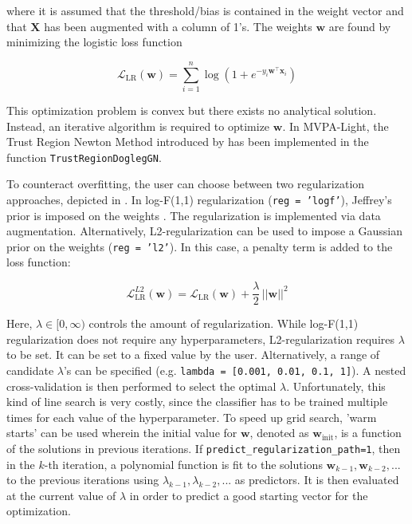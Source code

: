 \documentclass[utf8]{frontiersSCNS} %
\newcommand{\w}{\mathbf{w}}
\newcommand{\x}{\mathbf{x}}
\renewcommand{\L}{\mathcal{L}}
\newcommand{\X}{\mathbf{X}}
\newcommand{\ttt}[1]{\texttt{#1}}
\begin{document}
where it is assumed that the threshold/bias is contained in the weight vector and that $\X$ has been augmented with a column of 1's. The weights $\w$ are found by minimizing the logistic loss function

\begin{equation}
\label{eq:logreg_loss_function}
\L_\text{LR}(\w) = \sum_{i=1}^n \log(1 + e^{-y_i\w^\top\x_i})
\end{equation}

This optimization problem is convex but there exists no analytical solution. Instead, an iterative algorithm is required to optimize $\w$. In MVPA-Light, the Trust Region Newton Method introduced by \cite{Lin2007TrustRegression} has been implemented in the function \ttt{TrustRegionDoglegGN}.

To counteract overfitting, the user can choose between two regularization approaches, depicted in . In log-F(1,1) regularization (\ttt{reg = 'logf'}), Jeffrey's prior is imposed on the weights \citep{Firth1993BiasEstimates,Rahman2017PerformanceData.,King2001}. The regularization is implemented via data augmentation. Alternatively, L2-regularization can be used to impose a Gaussian prior on the weights (\ttt{reg = 'l2'}). In this case, a penalty term is added to the loss function:

\begin{equation}
\label{eq:logreg_loss_function_plus_penalty}
\L_\text{LR}^{L2}(\w) = \L_\text{LR}(\w) + \frac{\lambda}{2}\, ||\w||^2
\end{equation}

Here, $\lambda\in [0,\infty)$ controls the amount of regularization. While log-F(1,1) regularization does not require any hyperparameters, L2-regularization requires $\lambda$ to be set. It can be set to a fixed value by the user. Alternatively, a range of candidate $\lambda$'s can be specified (e.g. \ttt{lambda = [0.001, 0.01, 0.1, 1]}). A nested cross-validation is then performed to select the optimal $\lambda$.
Unfortunately, this kind of line search is very costly, since the classifier has to be trained multiple times for each value of the hyperparameter. To speed up grid search, 'warm starts' can be used wherein the initial value for $\w$, denoted as  $\w_\text{init}$, is a function of the solutions in previous iterations. If \ttt{predict\_regularization\_path=1}, then in the $k$-th iteration, a polynomial function is fit to the solutions $\w_{k-1},\w_{k-2},...$ to the previous iterations  using $\lambda_{k-1}, \lambda_{k-2}, ...$ as predictors. It is then evaluated at the current value of $\lambda$ in order to predict a good starting vector for the optimization.
\end{document}
